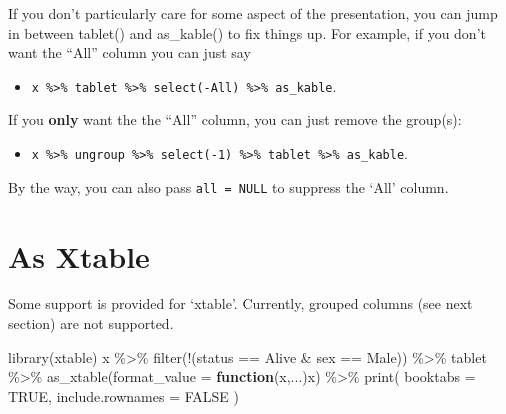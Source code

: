 \documentclass[
]{article}
\newenvironment{Shaded}{\begin{snugshade}}{\end{snugshade}}
\newcommand{\AttributeTok}[1]{\textcolor[rgb]{0.77,0.63,0.00}{#1}}
\newcommand{\ConstantTok}[1]{\textcolor[rgb]{0.00,0.00,0.00}{#1}}
\newcommand{\ControlFlowTok}[1]{\textcolor[rgb]{0.13,0.29,0.53}{\textbf{#1}}}
\newcommand{\FunctionTok}[1]{\textcolor[rgb]{0.00,0.00,0.00}{#1}}
\newcommand{\NormalTok}[1]{#1}
\newcommand{\SpecialCharTok}[1]{\textcolor[rgb]{0.00,0.00,0.00}{#1}}
\newcommand{\StringTok}[1]{\textcolor[rgb]{0.31,0.60,0.02}{#1}}
\providecommand{\tightlist}{%
  \setlength{\itemsep}{0pt}\setlength{\parskip}{0pt}}
\begin{document}
If you don't particularly care for some aspect of the presentation, you
can jump in between tablet() and as\_kable() to fix things up. For
example, if you don't want the ``All'' column you can just say

\begin{itemize}
\tightlist
\item
  \texttt{x\ \%\textgreater{}\%\ tablet\ \%\textgreater{}\%\ select(-All)\ \%\textgreater{}\%\ as\_kable}.
\end{itemize}

If you \textbf{only} want the the ``All'' column, you can just remove
the group(s):

\begin{itemize}
\tightlist
\item
  \texttt{x\ \%\textgreater{}\%\ ungroup\ \%\textgreater{}\%\ select(-1)\ \%\textgreater{}\%\ tablet\ \%\textgreater{}\%\ as\_kable}.
\end{itemize}

By the way, you can also pass \texttt{all\ =\ NULL} to suppress the
`All' column.

\hypertarget{as-xtable}{%
\section{As Xtable}\label{as-xtable}}

Some support is provided for `xtable'. Currently, grouped columns (see
next section) are not supported.

\begin{Shaded}
\begin{Highlighting}[]
\FunctionTok{library}\NormalTok{(xtable)}
\NormalTok{  x }\SpecialCharTok{\%\textgreater{}\%} 
    \FunctionTok{filter}\NormalTok{(}\SpecialCharTok{!}\NormalTok{(status }\SpecialCharTok{==} \StringTok{\textquotesingle{}Alive\textquotesingle{}} \SpecialCharTok{\&}\NormalTok{ sex }\SpecialCharTok{==} \StringTok{\textquotesingle{}Male\textquotesingle{}}\NormalTok{)) }\SpecialCharTok{\%\textgreater{}\%}
\NormalTok{    tablet }\SpecialCharTok{\%\textgreater{}\%} \FunctionTok{as\_xtable}\NormalTok{(}\AttributeTok{format\_value =} \ControlFlowTok{function}\NormalTok{(x,...)x) }\SpecialCharTok{\%\textgreater{}\%} 
    \FunctionTok{print}\NormalTok{(}
      \AttributeTok{booktabs =} \ConstantTok{TRUE}\NormalTok{, }
      \AttributeTok{include.rownames =} \ConstantTok{FALSE} 
\NormalTok{    )}
\end{Highlighting}
\end{Shaded}
\end{document}
